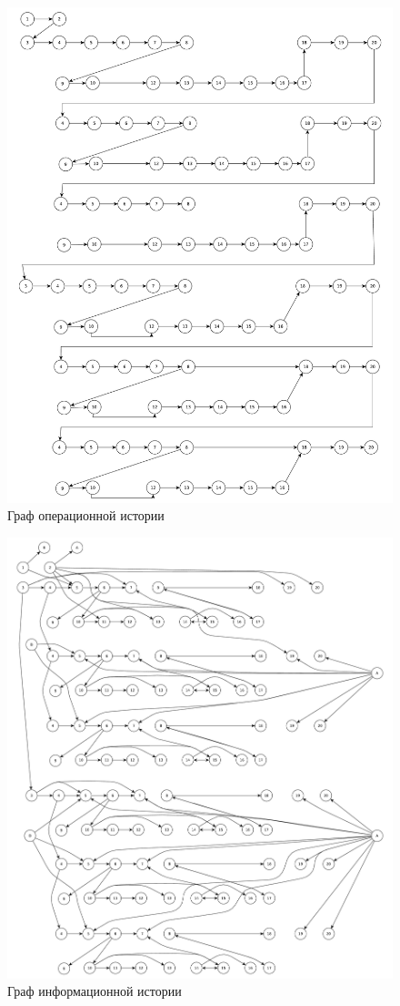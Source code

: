 \begin{figure}[ht!]
	\centering
	\includegraphics[width=1\linewidth]{assets/graphs/history_operation.pdf}
	\captionsetup{singlelinecheck = false, justification=centerfirst}
	\caption{Граф операционной истории}
	\label{oper-2}
\end{figure}
\begin{figure}[ht!]
	\centering
	\includegraphics[width=1\linewidth]{assets/graphs/history_information.pdf}
	\captionsetup{singlelinecheck = false, justification=centerfirst}
	\caption{Граф информационной истории}
	\label{info-2}
\end{figure}
